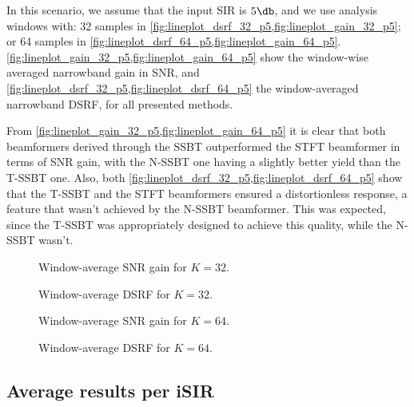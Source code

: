 In this scenario, we assume that the input SIR is $5\dB$, and we use analysis windows with: 32 samples in \cref{fig:lineplot_dsrf_32_p5,fig:lineplot_gain_32_p5}; or 64 samples in \cref{fig:lineplot_dsrf_64_p5,fig:lineplot_gain_64_p5}. \cref{fig:lineplot_gain_32_p5,fig:lineplot_gain_64_p5} show the window-wise averaged narrowband gain in SNR, and \cref{fig:lineplot_dsrf_32_p5,fig:lineplot_dsrf_64_p5} the window-averaged narrowband DSRF, for all presented methods.

From \cref{fig:lineplot_gain_32_p5,fig:lineplot_gain_64_p5} it is clear that both beamformers derived through the SSBT outperformed the STFT beamformer in terms of SNR gain, with the N-SSBT one having a slightly better yield than the T-SSBT one. Also, both \cref{fig:lineplot_dsrf_32_p5,fig:lineplot_dsrf_64_p5} show that the T-SSBT and the STFT beamformers ensured a distortionless response, a feature that wasn't achieved by the N-SSBT beamformer. This was expected, since the T-SSBT was appropriately designed to achieve this quality, while the N-SSBT wasn't.


\begin{figure}[H]
\centering

\caption{Window-average SNR gain for $K = 32$.}
\label{fig:lineplot_gain_32_p5}
\end{figure}
\begin{figure}[H]
	\centering
	
	\caption{Window-average DSRF for $K = 32$.}
	\label{fig:lineplot_dsrf_32_p5}
\end{figure}
%	


\begin{figure}[H]
\centering

\caption{Window-average SNR gain for $K = 64$.}
\label{fig:lineplot_gain_64_p5}
\end{figure}
\begin{figure}[H]
	\centering
	
	\caption{Window-average DSRF for $K = 64$.}
	\label{fig:lineplot_dsrf_64_p5}
\end{figure}

\subsection{Average results per iSIR}


